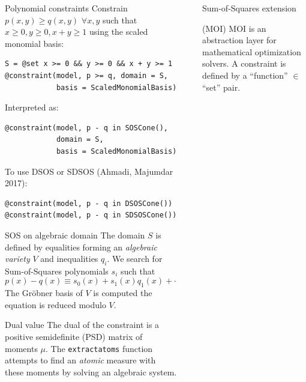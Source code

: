 \documentclass[final]{beamer}
\newlength{\sepwid}
\newlength{\onecolwid}
\begin{document}
\begin{frame}[t,fragile]
\begin{columns}[t]
\begin{column}{\onecolwid}
  \begin{block}{Polynomial constraints}
    Constrain $p(x, y) \geq q(x, y)$ $\forall x, y$ such that $x \ge 0, y \ge 0, x + y \ge 1$ using the scaled monomial basis:
\begin{verbatim}
S = @set x >= 0 && y >= 0 && x + y >= 1
@constraint(model, p >= q, domain = S,
            basis = ScaledMonomialBasis)
\end{verbatim}
    Interpreted as:
\begin{verbatim}
@constraint(model, p - q in SOSCone(),
            domain = S,
            basis = ScaledMonomialBasis)
\end{verbatim}
    To use DSOS or SDSOS (Ahmadi, Majumdar 2017): %
\begin{verbatim}
@constraint(model, p - q in DSOSCone())
@constraint(model, p - q in SDSOSCone())
\end{verbatim}
  \begin{alertblock}{SOS on algebraic domain}
    The domain $S$ is defined by equalities forming an \emph{algebraic variety}
    $V$ and inequalities $q_i$.
    We search for Sum-of-Squares polynomials $s_i$ such that
    \[ p(x) - q(x) \equiv s_0(x) + s_1(x) q_1(x) + \cdots \pmod{V} \]
    The Gr\"obner basis of $V$ is computed the equation is reduced modulo $V$.
  \end{alertblock}
  \end{block}

  \begin{block}{Dual value}
    The dual of the constraint is a positive semidefinite (PSD) matrix of moments $\mu$.
    The \texttt{extractatoms} function attempts to find an \emph{atomic} measure
    with these moments by solving an algebraic system.
  \end{block}
\end{column}

\begin{column}{\sepwid}\end{column} %

\begin{column}{\onecolwid} %
  \begin{block}{Sum-of-Squares extension}

    \begin{alertblock}{ (MOI)}
      MOI is an abstraction layer for mathematical optimization solvers.
      A constraint is defined by a ``function'' $\in$ ``set'' pair.
    \end{alertblock}


\end{block}
\end{column}
\end{columns}
\end{frame}
\end{document}
